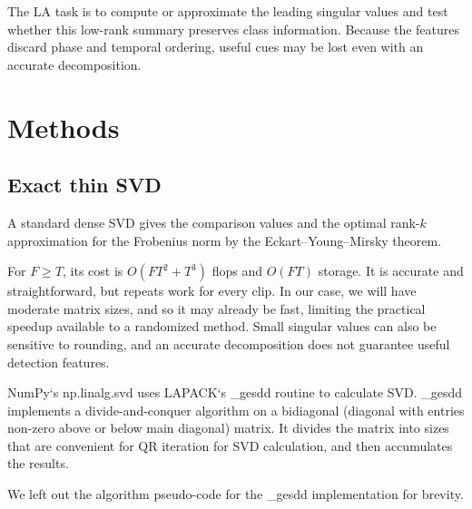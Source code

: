 \documentclass[11pt,a4paper]{article}
\theoremstyle{plain}
\theoremstyle{definition}
\theoremstyle{remark}
\begin{document}
The LA task is to compute or approximate the leading singular values
and test whether this low-rank summary preserves class information.
Because the features discard phase and temporal ordering,
useful cues may be lost even with an accurate decomposition.

\section{Methods}
\label{sec:methods}

\subsection{Exact thin SVD}

A standard dense SVD gives the comparison values and
the optimal rank-$k$ approximation for the Frobenius norm
by the Eckart--Young--Mirsky theorem.

For $F\geq T$, its cost is $O(FT^2+T^3)$ flops and $O(FT)$ storage.
It is accurate and straightforward, but repeats work for every clip.
In our case, we will have moderate matrix sizes, and so it may already be fast,
limiting the practical speedup available to a randomized method.
Small singular values can also be sensitive to rounding,
and an accurate decomposition does not guarantee useful detection features.

NumPy`s \textrm{np.linalg.svd} uses LAPACK`s \textrm{\_gesdd} routine
to calculate SVD. \textrm{\_gesdd} implements a divide-and-conquer algorithm
on a bidiagonal (diagonal with entries non-zero above or below main diagonal)
matrix. It divides the matrix into sizes that are convenient for QR iteration
for SVD calculation, and then accumulates the results.

We left out the algorithm pseudo-code for the \textrm{\_gesdd} implementation for brevity.
\end{document}

